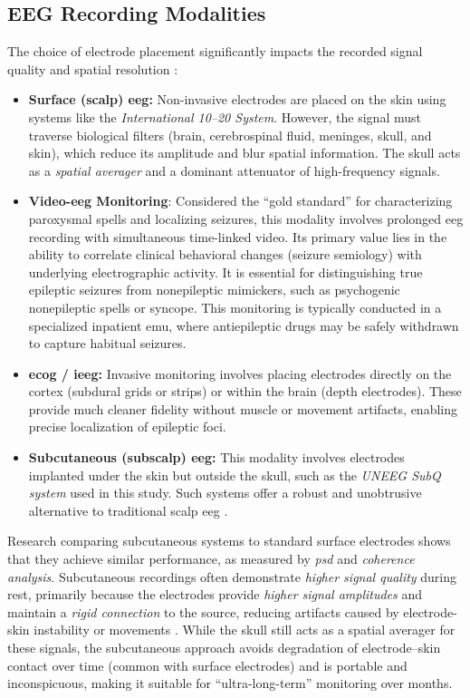 \subsection{EEG Recording Modalities}
The choice of electrode placement significantly impacts the recorded signal quality and spatial resolution \parencite{st_louis_electroencephalography_2016}:
\begin{itemize}
    \item \textbf{Surface (scalp) \gls{eeg}:} Non-invasive electrodes are placed on the skin using systems like the \textit{International 10--20 System}. 
    However, the signal must traverse biological filters (brain, cerebrospinal fluid, meninges, skull, and skin), which reduce its amplitude and blur spatial information. 
    The skull acts as a \textit{spatial averager} and a dominant attenuator of high-frequency signals.
    \item \textbf{Video-\gls{eeg} Monitoring}: Considered the \enquote{gold standard} for characterizing paroxysmal spells and localizing seizures, this modality involves prolonged \gls{eeg} recording with simultaneous time-linked video. 
    Its primary value lies in the ability to correlate clinical behavioral changes (seizure semiology) with underlying electrographic activity. 
    It is essential for distinguishing true epileptic seizures from nonepileptic mimickers, such as psychogenic nonepileptic spells or syncope. 
    This monitoring is typically conducted in a specialized inpatient \gls{emu}, where antiepileptic drugs may be safely withdrawn to capture habitual seizures.
    \item \textbf{\Gls{ecog} / \gls{ieeg}:} Invasive monitoring involves placing electrodes directly on the cortex (subdural grids or strips) or within the brain (depth electrodes). 
    These provide much cleaner fidelity without muscle or movement artifacts, enabling precise localization of epileptic foci.
    \item \textbf{Subcutaneous (subscalp) \gls{eeg}:} This modality involves electrodes implanted under the skin but outside the skull, such as the \textit{UNEEG SubQ system} used in this study.
    Such systems offer a robust and unobtrusive alternative to traditional scalp \gls{eeg} \parencite{duun-henriksen_subdural_2013}.
\end{itemize}

Research comparing subcutaneous systems to standard surface electrodes shows that they achieve similar performance, as measured by \textit{\gls{psd}} and \textit{coherence analysis}.
Subcutaneous recordings often demonstrate \textit{higher signal quality} during rest, primarily because the electrodes provide \textit{higher signal amplitudes} and maintain a \textit{rigid connection} to the source, reducing artifacts caused by electrode-skin instability or movements \parencite{duun-henriksen_eeg_2015}.
While the skull still acts as a spatial averager for these signals, the subcutaneous approach avoids degradation of electrode--skin contact over time (common with surface electrodes) and is portable and inconspicuous, making it suitable for \enquote{ultra-long-term} monitoring over months.



